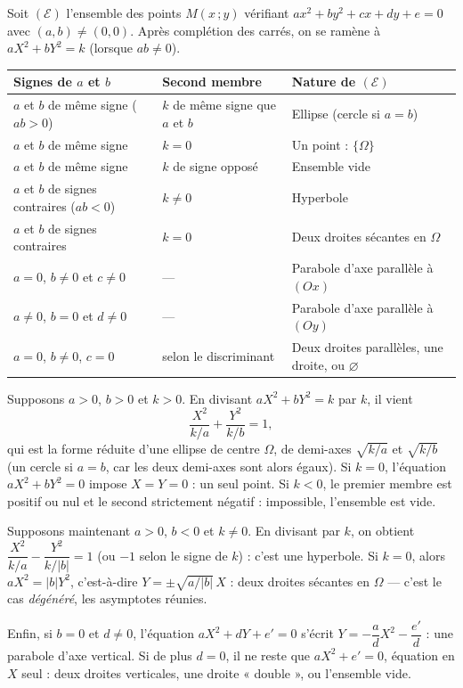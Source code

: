\documentclass[11pt]{article}
\newcommand{\cle}[1]{{\popxbold\color{popdark}#1}}
\begin{document}
\begin{propriete}
Soit $(\mathcal{E})$ l'ensemble des points $M(x\,;y)$ vérifiant $ax^2+by^2+cx+dy+e=0$ avec $(a,b)\neq(0,0)$. Après complétion des carrés, on se ramène à $aX^2+bY^2=k$ (lorsque $ab\neq 0$).
\begin{center}
\begin{tabularx}{\linewidth}{|l|l|X|}
\hline
\rowcolor{popblueL} \textbf{Signes de $a$ et $b$} & \textbf{Second membre} & \textbf{Nature de $(\mathcal{E})$} \\
\hline
$a$ et $b$ de même signe ($ab>0$) & $k$ de même signe que $a$ et $b$ & Ellipse (cercle si $a=b$) \\
\hline
$a$ et $b$ de même signe & $k=0$ & Un point : $\{ \Omega \}$ \\
\hline
$a$ et $b$ de même signe & $k$ de signe opposé & Ensemble vide \\
\hline
$a$ et $b$ de signes contraires ($ab<0$) & $k\neq 0$ & Hyperbole \\
\hline
$a$ et $b$ de signes contraires & $k=0$ & Deux droites sécantes en $\Omega$ \\
\hline
$a=0$, $b\neq 0$ et $c\neq 0$ & --- & Parabole d'axe parallèle à $(Ox)$ \\
\hline
$a\neq 0$, $b=0$ et $d\neq 0$ & --- & Parabole d'axe parallèle à $(Oy)$ \\
\hline
$a=0$, $b\neq 0$, $c=0$ & selon le discriminant & Deux droites parallèles, une droite, ou $\varnothing$ \\
\hline
\end{tabularx}
\end{center}
\end{propriete}

\begin{experience}
Supposons $a>0$, $b>0$ et $k>0$. En divisant $aX^2+bY^2=k$ par $k$, il vient
\[ \dfrac{X^2}{k/a}+\dfrac{Y^2}{k/b}=1, \]
qui est la forme réduite d'une \cle{ellipse} de centre $\Omega$, de demi-axes $\sqrt{k/a}$ et $\sqrt{k/b}$ (un \cle{cercle} si $a=b$, car les deux demi-axes sont alors égaux). Si $k=0$, l'équation $aX^2+bY^2=0$ impose $X=Y=0$ : un seul point. Si $k<0$, le premier membre est positif ou nul et le second strictement négatif : impossible, l'ensemble est vide.

Supposons maintenant $a>0$, $b<0$ et $k\neq 0$. En divisant par $k$, on obtient $\dfrac{X^2}{k/a}-\dfrac{Y^2}{k/|b|}=1$ (ou $-1$ selon le signe de $k$) : c'est une \cle{hyperbole}. Si $k=0$, alors $aX^2=|b|Y^2$, c'est-à-dire $Y=\pm\sqrt{a/|b|}\,X$ : deux droites sécantes en $\Omega$ — c'est le cas \emph{dégénéré}, les asymptotes réunies.

Enfin, si $b=0$ et $d\neq 0$, l'équation $aX^2+dY+e'=0$ s'écrit $Y=-\dfrac{a}{d}X^2-\dfrac{e'}{d}$ : une \cle{parabole} d'axe vertical. Si de plus $d=0$, il ne reste que $aX^2+e'=0$, équation en $X$ seul : deux droites verticales, une droite « double », ou l'ensemble vide.
\end{experience}
\end{document}
